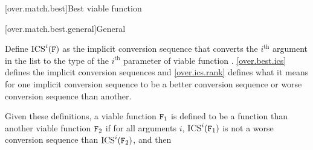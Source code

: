 [over.match.best]{Best viable function}%

[over.match.best.general]{General}%

\pnum
{}%
Define $\text{ICS}^i(\texttt{\protect F})$ as
the implicit conversion sequence that converts
the $i^\text{th}$ argument in the list to the type of
the $i^\text{th}$ parameter of viable function .
\ref{over.best.ics} defines the implicit conversion sequences and \ref{over.ics.rank}
defines what it means for one implicit conversion sequence to be
a better conversion sequence or worse conversion sequence than
another.

\pnum
Given these definitions,
a viable function $\texttt{\protect F}_1$ is defined to be a
function than another viable function $\texttt{\protect F}_2$
if for all arguments $i$,
$\text{ICS}^i(\texttt{\protect F}_1)$ is not a worse conversion
sequence than $\text{ICS}^i(\texttt{\protect F}_2)$, and then
